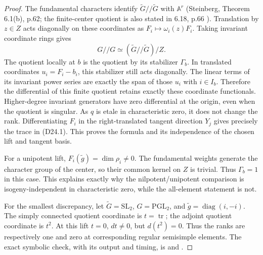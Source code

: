 \begin{proof}
The fundamental characters identify
$\widetilde G/\!/\widetilde G$ with $\mathbb A^r$
(Steinberg, Theorem 6.1(b), p.62; the finite-center quotient
is also stated in 6.18, p.66 \cite{D-Steinberg1965}).
Translation by $z\in Z$ acts diagonally on these coordinates as
$F_i\mapsto\omega_i(z)F_i$.  Taking invariant coordinate rings gives
\[
 G/\!/G\simeq(\widetilde G/\!/\widetilde G)/Z.
\]
The quotient locally at $b$ is the quotient by its stabilizer
$\Gamma_b$.  In translated coordinates $u_i=F_i-b_i$, this
stabilizer still acts diagonally.  The linear terms of its invariant
power series are exactly the span of those $u_i$ with $i\in I_b$.
Therefore the differential of this finite quotient retains exactly
these coordinate functionals.  Higher-degree invariant generators
have zero differential at the origin, even when the quotient is
singular.  As $q$ is etale in characteristic zero, it does not
change the rank.  Differentiating $F_i$ in the right-translated
tangent direction $Y_j$ gives precisely the trace in (D24.1).
This proves the formula and its independence of the chosen lift
and tangent basis.

For a unipotent lift, $F_i(\widetilde g)=\dim\rho_i\ne0$.
The fundamental weights generate the character group of the
center, so their common kernel on $Z$ is trivial.  Thus
$\Gamma_b=1$ in this case.  This explains exactly why the
nilpotent/unipotent comparison is isogeny-independent in
characteristic zero, while the all-element statement is not.

For the smallest discrepancy, let
$\widetilde G=\mathrm{SL}_2$, $G=\mathrm{PGL}_2$, and
$\widetilde g=\operatorname{diag}(i,-i)$.
The simply connected quotient coordinate is $t=\operatorname{tr}$;
the adjoint quotient coordinate is $t^2$.  At this lift $t=0$,
$dt\ne0$, but $d(t^2)=0$.  Thus the ranks are respectively
one and zero at corresponding regular semisimple elements.
The exact symbolic check, with its output and timing, is
 and
.
\end{proof}

